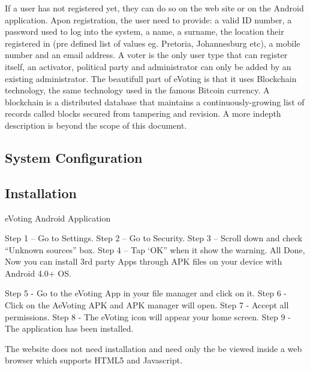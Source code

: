 \documentclass[11pt]{article}
\begin{document}
	If a user has not registered yet, they can do so on the web site or on the Android application. Apon registration, the user need to provide: a valid ID number, a password used to log into the system, a name, a surname, the location their registered in (pre defined list of values eg. Pretoria, Johannesburg etc), a mobile number and an email address. A voter is the only user type that can register itself, an activator, political party and administrator can only be added by an existing administrator.\newline\newline
	The beautifull part of eVoting is that it uses Blockchain technology, the same technology used in the famous Bitcoin currency. A blockchain is a distributed database that maintains a continuously-growing list of records called blocks secured from tampering and revision. A more indepth description is beyond the scope of this document.
	\newpage
	\subsection{System Configuration}

	\subsection{Installation}
	eVoting Android Application
	
	Step 1 – Go to Settings.
	Step 2 – Go to Security.
	Step 3 – Scroll down and check “Unknown sources” box.
	Step 4 – Tap ‘OK” when it show the warning.
	All Done, Now you can install 3rd party Apps through APK files on your device with Android 4.0+ OS.
	
	Step 5 - Go to the eVoting App in your file manager and click on it.  
	Step 6 - Click on the AeVoting APK and APK manager will open. 
	Step 7 - Accept all permissions. 
	Step 8 - The eVoting icon will appear your home screen.
	Step 9 - The application has been installed.
					
	The website does not need installation and need only the be viewed inside a web browser which supports HTML5 and Javascript.
	
\end{document}
